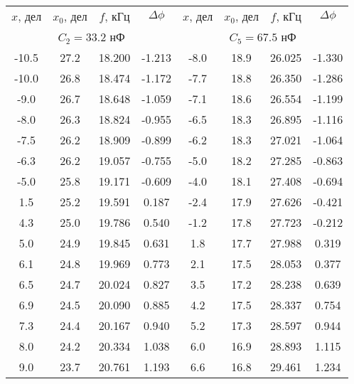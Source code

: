 \begin{tabular}{cccc|cccc}
\toprule
$x$, дел & $x_0$, дел & $f$, кГц & $\Delta \phi$ & $x$, дел & $x_0$, дел & $f$, кГц & $\Delta \phi$ \\
\multicolumn{4}{c}{$C_2=33.2$ нФ} & \multicolumn{4}{c}{$C_5=67.5$ нФ} \\
\midrule
-10.5 & 27.2 & 18.200 & -1.213 & -8.0 & 18.9 & 26.025 & -1.330 \\
-10.0 & 26.8 & 18.474 & -1.172 & -7.7 & 18.8 & 26.350 & -1.286 \\
 -9.0 & 26.7 & 18.648 & -1.059 & -7.1 & 18.6 & 26.554 & -1.199 \\
 -8.0 & 26.3 & 18.824 & -0.955 & -6.5 & 18.3 & 26.895 & -1.116 \\
 -7.5 & 26.2 & 18.909 & -0.899 & -6.2 & 18.3 & 27.021 & -1.064 \\
 -6.3 & 26.2 & 19.057 & -0.755 & -5.0 & 18.2 & 27.285 & -0.863 \\
 -5.0 & 25.8 & 19.171 & -0.609 & -4.0 & 18.1 & 27.408 & -0.694 \\
  1.5 & 25.2 & 19.591 &  0.187 & -2.4 & 17.9 & 27.626 & -0.421 \\
  4.3 & 25.0 & 19.786 &  0.540 & -1.2 & 17.8 & 27.723 & -0.212 \\
  5.0 & 24.9 & 19.845 &  0.631 &  1.8 & 17.7 & 27.988 &  0.319 \\
  6.1 & 24.8 & 19.969 &  0.773 &  2.1 & 17.5 & 28.053 &  0.377 \\
  6.5 & 24.7 & 20.024 &  0.827 &  3.5 & 17.2 & 28.238 &  0.639 \\
  6.9 & 24.5 & 20.090 &  0.885 &  4.2 & 17.5 & 28.337 &  0.754 \\
  7.3 & 24.4 & 20.167 &  0.940 &  5.2 & 17.3 & 28.597 &  0.944 \\
  8.0 & 24.2 & 20.334 &  1.038 &  6.0 & 16.9 & 28.893 &  1.115 \\
  9.0 & 23.7 & 20.761 &  1.193 &  6.6 & 16.8 & 29.461 &  1.234 \\
\bottomrule
\end{tabular}
